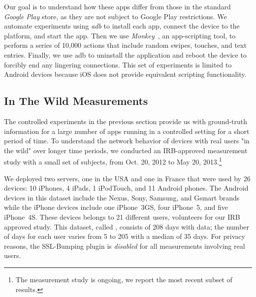 Our goal is to understand how these apps differ from those in the standard \emph{Google Play} 
store, as they are not subject to Google Play restrictions.
We automate experiments using \emph{adb} to
install each app, connect the device to the \platname{} platform, and
start the app. Then we use \emph{Monkey}~\cite{adbmonkey}, an app-scripting 
tool, to perform a series of 10,000 actions that include
random swipes, touches, and text entries.  Finally, we use adb to
uninstall the application and reboot the device to forcibly end any
lingering connections. This set of experiments is limited to
Android devices because iOS does not provide equivalent 
scripting functionality. 


\subsection{In The Wild Measurements}
\label{sec:dataset-wild-measurements}

The controlled experiments in the previous section provide us with 
ground-truth information for a large number of apps running in a controlled 
setting for a short period of time. To understand the network behavior of 
devices with real users "in the wild" over longer time periods, we conducted 
an IRB-approved measurement study with a small set of subjects, from 
Oct. 20, 2012 to May 20, 2013.\footnote{The measurement study is ongoing, we report the most recent subset of results.}

We deployed two \platname servers, one in the USA and one in France
that were used by 26 devices: 10 iPhones, 4 iPads, 1 iPodTouch, and 11
Android phones.  The Android devices in this dataset include the
Nexus, Sony, Samsung, and Gsmart brands while the iPhone devices
include one iPhone~3GS, four iPhone~5, and five iPhone~4S.  These
devices belongs to 21 different users, volunteers for our IRB approved
study.  This dataset, called \mobWild, consists of 208 days with data; the number of 
days for each user varies from 5 to 205 with a median of 35 days.  For privacy reasons, the
SSL-Bumping plugin is \emph{disabled} for all measurements involving
real users.

